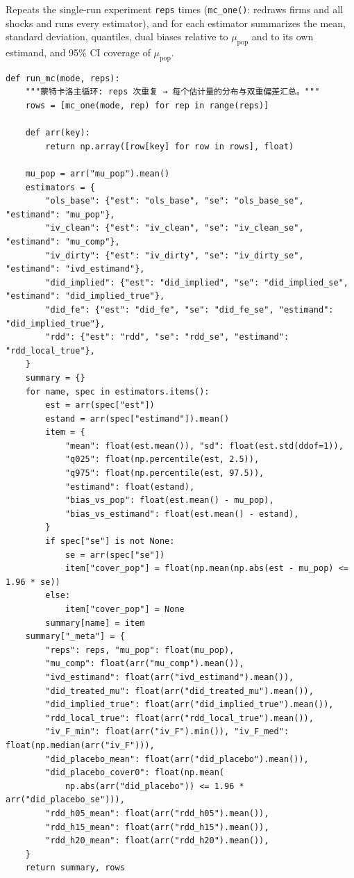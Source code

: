 \documentclass[12pt,a4paper]{ctexart}
\begin{document}
Repeats the single-run experiment \texttt{reps} times (\texttt{mc\_one()}: redraws firms and all shocks and runs every estimator), and for each estimator summarizes the mean, standard deviation, quantiles, dual biases relative to $\mu_{\mathrm{pop}}$ and to its own estimand, and 95\% CI coverage of $\mu_{\mathrm{pop}}$.

\begin{lstlisting}[style=pycode]
def run_mc(mode, reps):
    """蒙特卡洛主循环: reps 次重复 → 每个估计量的分布与双重偏差汇总。"""
    rows = [mc_one(mode, rep) for rep in range(reps)]

    def arr(key):
        return np.array([row[key] for row in rows], float)

    mu_pop = arr("mu_pop").mean()
    estimators = {
        "ols_base": {"est": "ols_base", "se": "ols_base_se", "estimand": "mu_pop"},
        "iv_clean": {"est": "iv_clean", "se": "iv_clean_se", "estimand": "mu_comp"},
        "iv_dirty": {"est": "iv_dirty", "se": "iv_dirty_se", "estimand": "ivd_estimand"},
        "did_implied": {"est": "did_implied", "se": "did_implied_se", "estimand": "did_implied_true"},
        "did_fe": {"est": "did_fe", "se": "did_fe_se", "estimand": "did_implied_true"},
        "rdd": {"est": "rdd", "se": "rdd_se", "estimand": "rdd_local_true"},
    }
    summary = {}
    for name, spec in estimators.items():
        est = arr(spec["est"])
        estand = arr(spec["estimand"]).mean()
        item = {
            "mean": float(est.mean()), "sd": float(est.std(ddof=1)),
            "q025": float(np.percentile(est, 2.5)),
            "q975": float(np.percentile(est, 97.5)),
            "estimand": float(estand),
            "bias_vs_pop": float(est.mean() - mu_pop),
            "bias_vs_estimand": float(est.mean() - estand),
        }
        if spec["se"] is not None:
            se = arr(spec["se"])
            item["cover_pop"] = float(np.mean(np.abs(est - mu_pop) <= 1.96 * se))
        else:
            item["cover_pop"] = None
        summary[name] = item
    summary["_meta"] = {
        "reps": reps, "mu_pop": float(mu_pop),
        "mu_comp": float(arr("mu_comp").mean()),
        "ivd_estimand": float(arr("ivd_estimand").mean()),
        "did_treated_mu": float(arr("did_treated_mu").mean()),
        "did_implied_true": float(arr("did_implied_true").mean()),
        "rdd_local_true": float(arr("rdd_local_true").mean()),
        "iv_F_min": float(arr("iv_F").min()), "iv_F_med": float(np.median(arr("iv_F"))),
        "did_placebo_mean": float(arr("did_placebo").mean()),
        "did_placebo_cover0": float(np.mean(
            np.abs(arr("did_placebo")) <= 1.96 * arr("did_placebo_se"))),
        "rdd_h05_mean": float(arr("rdd_h05").mean()),
        "rdd_h15_mean": float(arr("rdd_h15").mean()),
        "rdd_h20_mean": float(arr("rdd_h20").mean()),
    }
    return summary, rows
\end{lstlisting}
\end{document}
